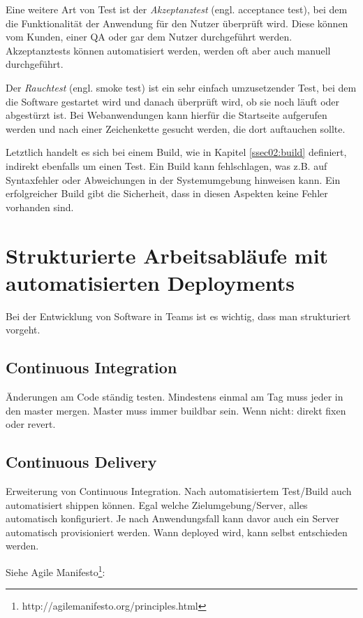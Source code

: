 Eine weitere Art von Test ist der \emph{Akzeptanztest} (engl. acceptance test), bei dem die Funktionalität der Anwendung für den Nutzer überprüft wird. Diese können vom Kunden, einer \ac{QA} oder gar dem Nutzer durchgeführt werden. Akzeptanztests können automatisiert werden, werden oft aber auch manuell durchgeführt.

Der \emph{Rauchtest} (engl. smoke test) ist ein sehr einfach umzusetzender Test, bei dem die Software gestartet wird und danach überprüft wird, ob sie noch läuft oder abgestürzt ist. Bei Webanwendungen kann hierfür die Startseite aufgerufen werden und nach einer Zeichenkette gesucht werden, die dort auftauchen sollte.

Letztlich handelt es sich bei einem Build, wie in Kapitel \ref{ssec02:build} definiert, indirekt ebenfalls um einen Test. Ein Build kann fehlschlagen, was z.B. auf Syntaxfehler oder Abweichungen in der Systemumgebung hinweisen kann. Ein erfolgreicher Build gibt die Sicherheit, dass in diesen Aspekten keine Fehler vorhanden sind.


\section{Strukturierte Arbeitsabläufe mit automatisierten Deployments}

Bei der Entwicklung von Software in Teams ist es wichtig, dass man strukturiert vorgeht.

\subsection{Continuous Integration}

Änderungen am Code ständig testen. Mindestens einmal am Tag muss jeder in den master mergen. Master muss immer buildbar sein. Wenn nicht: direkt fixen oder revert.

\subsection{Continuous Delivery}

Erweiterung von Continuous Integration. Nach automatisiertem Test/Build auch automatisiert shippen können. Egal welche Zielumgebung/Server, alles automatisch konfiguriert. Je nach Anwendungsfall kann davor auch ein Server automatisch provisioniert werden. Wann deployed wird, kann selbst entschieden werden.

Siehe Agile Manifesto\footnote{http://agilemanifesto.org/principles.html}:

